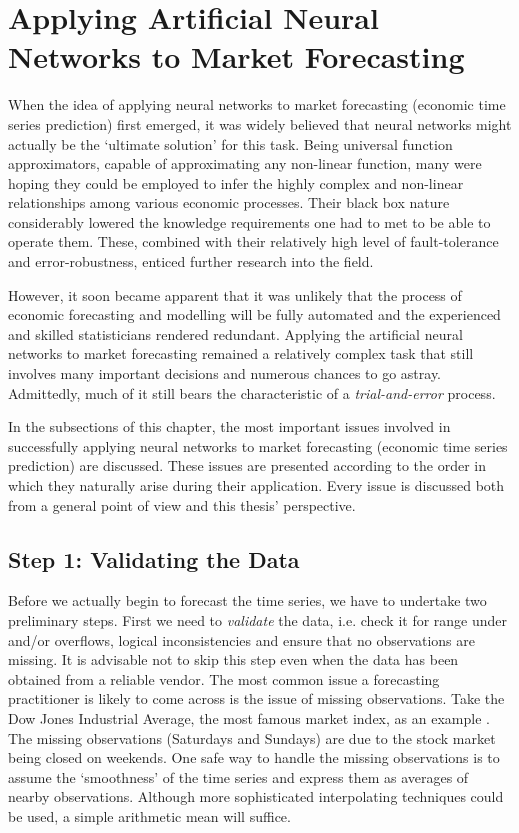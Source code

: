 \chapter{Applying Artificial Neural Networks to Market Forecasting}

When the idea of applying neural networks to market forecasting (economic time series prediction) first emerged, it was widely believed that neural networks might actually be the `ultimate solution' for this task. Being universal function approximators, capable of approximating any non-linear function, many were hoping they could be employed to infer the highly complex and non-linear relationships among various economic processes. Their black box nature considerably lowered the knowledge requirements one had to met to be able to operate them. These, combined with their relatively high level of fault-tolerance and error-robustness, enticed further research into the field.

However, it soon became apparent that it was unlikely that the process of economic forecasting and modelling will be fully automated and the experienced and skilled statisticians rendered redundant. Applying the artificial neural networks to market forecasting remained a relatively complex task that still involves many important decisions and numerous chances to go astray. Admittedly, much of it still bears the characteristic of a \textit{trial-and-error} process.

In the subsections of this chapter, the most important issues involved in successfully applying neural networks to market forecasting (economic time series prediction) are discussed. These issues are presented according to the order in which they naturally arise during their application. Every issue is discussed both from a general point of view and this thesis' perspective.

\section{Step 1: Validating the Data}

Before we actually begin to forecast the time series, we have to undertake two preliminary steps. First we need to \textit{validate} the data, i.e. check it for range under and/or overflows, logical inconsistencies and ensure that no observations are missing. It is advisable not to skip this step even when the data has been obtained from a reliable vendor.
The most common issue a forecasting practitioner is likely to come across is the issue of missing observations. Take the Dow Jones Industrial Average, the most famous market index, as an example \cite{DJIA}. The missing observations (Saturdays and Sundays) are due to the stock market being closed on weekends. One safe way to handle the missing observations is to assume the `smoothness' of the time series and express them as averages of nearby observations. Although more sophisticated interpolating techniques could be used, a simple arithmetic mean will suffice.

